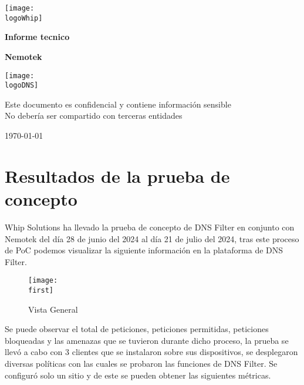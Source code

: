 \documentclass[a4paper]{article}
\newcommand{\canal}{Nemotek}
\newcommand{\startDate}{\today}
\newcommand{\logoDNS}{img/largeDns.pdf}
\newcommand{\logoWhip}{img/largeW.png}
\newcommand{\first}{img/overView.png}
\begin{document}
    \begin{titlepage}
        \centering
        \texttt{[image: \\logoWhip]}
        \par\vspace{1cm}
        {\LARGE\textbf{Informe tecnico}}
        \par\vspace{0.4cm}
        {\Huge\bfseries\textcolor{greenPortada}{\canal}}
        \vfill

        \par\vspace{0.4cm}
        \texttt{[image: \\logoDNS]}
        \vfill

        \par\vspace{1cm}
        \begin{tcolorbox}[colback=red!5!white,colframe=red!75!black]
            \centering
            Este documento es confidencial y contiene información sensible
            \\
            No debería ser compartido con terceras entidades
        \end{tcolorbox}
        \vfill

        {\large\startDate\par}

    \end{titlepage}
    \clearpage

    \section{Resultados de la prueba de concepto}
    Whip Solutions ha llevado la prueba de concepto de DNS Filter en conjunto con Nemotek del día 28 de junio del 2024 al día 21 de julio del 2024, tras este proceso de PoC podemos visualizar la siguiente información en la plataforma de DNS Filter.

    \begin{figure}[H] 
        \centering 
        \texttt{[image: \\first]} 
        \caption{Vista General} 
    \end{figure} 

    Se puede observar el total de peticiones, peticiones permitidas, peticiones bloqueadas y las amenazas que se tuvieron durante dicho proceso, la prueba se llevó a cabo con 3 clientes que se instalaron sobre sus dispositivos, se desplegaron diversas políticas con las cuales se probaron las funciones de DNS Filter.
    Se configuró solo un sitio y de este se pueden obtener las siguientes métricas. 
\end{document}
